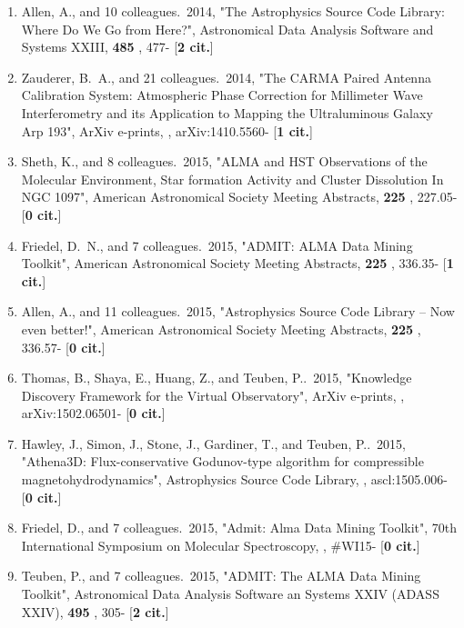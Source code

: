 \documentclass[11pt,letterpaper]{article}
\begin{document}
\begin{enumerate}[resume,label=\textbf{\arabic*}.]
\item  
Allen, A., and 10 colleagues.\  2014,  "The Astrophysics Source Code 
Library: Where Do We Go from Here?", Astronomical Data Analysis Software 
and Systems XXIII,  {\bf 485} , 477- [{\bf 2 cit.}] 

\item  
Zauderer, B.~A., and 21 colleagues.\  2014,  "The CARMA Paired Antenna 
Calibration System: Atmospheric Phase Correction for Millimeter Wave 
Interferometry and its Application to Mapping the Ultraluminous Galaxy Arp 
193", ArXiv e-prints,  , arXiv:1410.5560- [{\bf 1 cit.}] 

\item  
Sheth, K., and 8 colleagues.\  2015,  "ALMA and HST Observations of the 
Molecular Environment, Star formation Activity and Cluster Dissolution In 
NGC 1097", American Astronomical Society Meeting Abstracts,  {\bf 225} , 
227.05- [{\bf 0 cit.}] 

\item  
Friedel, D.~N., and 7 colleagues.\  2015,  "ADMIT: ALMA Data Mining 
Toolkit", American Astronomical Society Meeting Abstracts,  {\bf 225} , 
336.35- [{\bf 1 cit.}] 

\item  
Allen, A., and 11 colleagues.\  2015,  "Astrophysics Source Code Library -- 
Now even better!", American Astronomical Society Meeting Abstracts,  {\bf 
225} , 336.57- [{\bf 0 cit.}] 

\item  
Thomas, B., Shaya, E., Huang, Z., and Teuben, P..\  2015,  "Knowledge 
Discovery Framework for the Virtual Observatory", ArXiv e-prints,  , 
arXiv:1502.06501- [{\bf 0 cit.}] 

\item  
Hawley, J., Simon, J., Stone, J., Gardiner, T., and Teuben, P..\  2015,  
"Athena3D: Flux-conservative Godunov-type algorithm for compressible 
magnetohydrodynamics", Astrophysics Source Code Library,  , ascl:1505.006- 
[{\bf 0 cit.}] 

\item  
Friedel, D., and 7 colleagues.\  2015,  "Admit: Alma Data Mining Toolkit", 
70th International Symposium on Molecular Spectroscopy,  , \#WI15- [{\bf 0 
cit.}] 

\item  
Teuben, P., and 7 colleagues.\  2015,  "ADMIT: The ALMA Data Mining 
Toolkit", Astronomical Data Analysis Software an Systems XXIV (ADASS XXIV),  
{\bf 495} , 305- [{\bf 2 cit.}] 


\end{enumerate}
\end{document}
